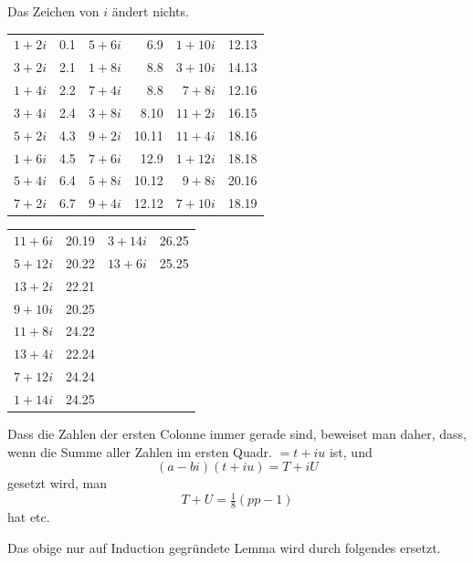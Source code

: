 \begin{center}
\par\smallskip Das Zeichen von $i$ ändert nichts.
\end{center}
\begingroup\small\setlength{\tabcolsep}{5pt}\renewcommand{\arraystretch}{1.12}
\begin{center}
\begin{tabular}{r|r@{\qquad}r|r@{\qquad}r|r}
$1+2i$&0.1&$5+6i$&6.9&$1+10i$&12.13\\
$3+2i$&2.1&$1+8i$&8.8&$3+10i$&14.13\\
$1+4i$&2.2&$7+4i$&8.8&$7+8i$&12.16\\
$3+4i$&2.4&$3+8i$&8.10&$11+2i$&16.15\\
$5+2i$&4.3&$9+2i$&10.11&$11+4i$&18.16\\
$1+6i$&4.5&$7+6i$&12.9&$1+12i$&18.18\\
$5+4i$&6.4&$5+8i$&10.12&$9+8i$&20.16\\
$7+2i$&6.7&$9+4i$&12.12&$7+10i$&18.19
\end{tabular}
\par\medskip
\begin{tabular}{r|r@{\qquad}r|r}
$11+6i$&20.19&$3+14i$&26.25\\
$5+12i$&20.22&$13+6i$&25.25\\
$13+2i$&22.21&\multicolumn{1}{r}{}&\\
$9+10i$&20.25&\multicolumn{1}{r}{}&\\
$11+8i$&24.22&\multicolumn{1}{r}{}&\\
$13+4i$&22.24&\multicolumn{1}{r}{}&\\
$7+12i$&24.24&\multicolumn{1}{r}{}&\\
$1+14i$&24.25&\multicolumn{1}{r}{}&
\end{tabular}
\end{center}\endgroup
\noindent Dass die Zahlen der ersten Colonne immer gerade sind, beweiset man daher, dass, wenn die Summe aller Zahlen im ersten Quadr. $=t+iu$ ist, und
\[
(a-bi)(t+iu)=T+iU
\]
\noindent gesetzt wird, man
\[
T+U=\tfrac18(pp-1)
\]
\noindent hat etc.
\par\indent Das obige nur auf Induction gegründete Lemma wird durch folgendes ersetzt.

